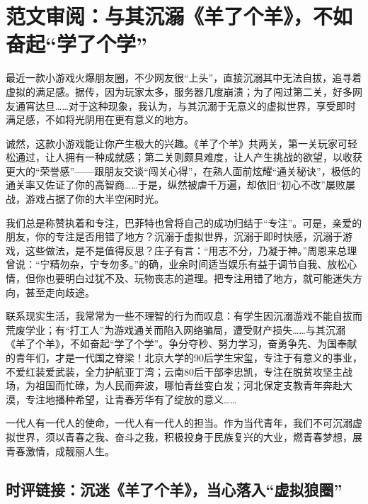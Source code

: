\clearpage
\section*{范文审阅：与其沉溺《羊了个羊》，不如奋起“学了个学”}

最近一款小游戏火爆朋友圈，不少网友很“上头”，直接沉溺其中无法自拔，追寻着虚拟的满足感。据传，因为玩家太多，服务器几度崩溃；为了闯过第二关，好多网友通宵达旦……对于这种现象，我认为，与其沉溺于无意义的虚拟世界，享受即时满足感，不如将光阴用在更有意义的地方。

诚然，这款小游戏能让你产生极大的兴趣。《羊了个羊》共两关，第一关玩家可轻松通过，让人拥有一种成就感；第二关则颇具难度，让人产生挑战的欲望，以收获更大的“荣誉感”——跟朋友交谈“闯关心得”，在熟人面前炫耀“通关秘诀”，极低的通关率又佐证了你的高智商……于是，纵然被虐千万遍，却依旧“初心不改”屡败屡战，游戏占据了你的大半空闲时光。

我们总是称赞执着和专注，巴菲特也曾将自己的成功归结于“专注”。可是，亲爱的朋友，你的专注是否用错了地方？沉溺于虚拟世界，沉溺于即时快感，沉溺于游戏，这些做法，是不是值得反思？庄子有言：“用志不分，乃凝于神。”周恩来总理曾说：“宁精勿杂，宁专勿多。”的确，业余时间适当娱乐有益于调节自我、放松心情，但你也要明白过犹不及、玩物丧志的道理。把专注用错了地方，就可能迷失方向，甚至走向歧途。

联系现实生活，我常常为一些不理智的行为而叹息：有学生因沉溺游戏不能自拔而荒废学业；有“打工人”为游戏通关而陷入网络骗局，遭受财产损失……与其沉溺《羊了个羊》，不如奋起“学了个学”。争分夺秒、努力学习，奋勇争先、为国奉献的青年们，才是一代国之脊梁！北京大学的90后学生宋玺，专注于有意义的事业，不爱红装爱武装，全力护航亚丁湾；云南80后干部李忠凯，专注在脱贫攻坚主战场，为祖国而忙碌，为人民而奔波，哪怕青丝变白发；河北保定支教青年奔赴大漠，专注地播种希望，让青春芳华有了绽放的意义……

一代人有一代人的使命，一代人有一代人的担当。作为当代青年，我们不可沉溺虚拟世界，须以青春之我、奋斗之我，积极投身于民族复兴的大业，燃青春梦想，展青春激情，成靓丽人生。


\subsection*{时评链接：沉迷《羊了个羊》，当心落入“虚拟狼圈”}


